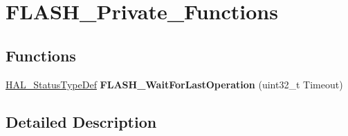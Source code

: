 \hypertarget{group___f_l_a_s_h___private___functions}{}\section{F\+L\+A\+S\+H\+\_\+\+Private\+\_\+\+Functions}
\label{group___f_l_a_s_h___private___functions}
\subsection*{Functions}
\begin{DoxyCompactItemize}
\item 
\mbox{\label{group___f_l_a_s_h___private___functions_gaf89afc110a32ac9dcf0d06b89ffd9224}} 
\hyperlink{stm32f0xx__hal__def_8h_a63c0679d1cb8b8c684fbb0632743478f}{H\+A\+L\+\_\+\+Status\+Type\+Def} {\bfseries F\+L\+A\+S\+H\+\_\+\+Wait\+For\+Last\+Operation} (uint32\+\_\+t Timeout)
\end{DoxyCompactItemize}


\subsection{Detailed Description}
